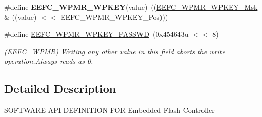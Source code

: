 \begin{DoxyCompactItemize}
\mbox{\label{group__SAMS70__EFC_ga9f22a162b2b843aa457003a172178e44}} 
\#define {\bfseries E\+E\+F\+C\+\_\+\+W\+P\+M\+R\+\_\+\+W\+P\+K\+EY}(value)~((\mbox{\hyperlink{group__SAMV71__EFC_ga6d0a055ac41342fef0fc0fde79d40879}{E\+E\+F\+C\+\_\+\+W\+P\+M\+R\+\_\+\+W\+P\+K\+E\+Y\+\_\+\+Msk}} \& ((value) $<$$<$ E\+E\+F\+C\+\_\+\+W\+P\+M\+R\+\_\+\+W\+P\+K\+E\+Y\+\_\+\+Pos)))
\item 
\mbox{\label{group__SAMS70__EFC_gabcb88b0cdf5f0c55f51b950f101dcfbb}} 
\#define \mbox{\hyperlink{group__SAMS70__EFC_gabcb88b0cdf5f0c55f51b950f101dcfbb}{E\+E\+F\+C\+\_\+\+W\+P\+M\+R\+\_\+\+W\+P\+K\+E\+Y\+\_\+\+P\+A\+S\+S\+WD}}~(0x454643u $<$$<$ 8)
\begin{DoxyCompactList}\small\item\em (E\+E\+F\+C\+\_\+\+W\+P\+MR) Writing any other value in this field aborts the write operation.\+Always reads as 0. \end{DoxyCompactList}\end{DoxyCompactItemize}


\subsection{Detailed Description}
S\+O\+F\+T\+W\+A\+RE A\+PI D\+E\+F\+I\+N\+I\+T\+I\+ON F\+OR Embedded Flash Controller 